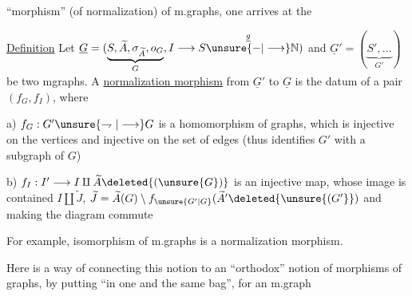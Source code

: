 ``morphism'' (of normalization) of m.graphs, one arrives at the

\uline{Definition} Let $\underline G=(\underbrace{S,\widetilde A,\sigma_{\widetilde A},o_G}_{G},I\longrightarrow S\overset{\underline g}{\unsure{-|\longrightarrow}}\mathbb N)$ and $\underline G'=(\underbrace{S',\ldots}_{G'})$ be two mgraphs. A \uline{normalization morphism} from $\underline G'$ to $\underline G$ is the datum of a pair  $(f_G,f_I)$, where

a) $f_G:G'\unsure{\rightharpoondown|\longrightarrow}G$ is a homomorphism of graphs, which is injective on the vertices and injective on the set of edges (thus identifies $G'$ with a subgraph of $G$)


b) $f_I:I'\longrightarrow I\amalg\widetilde A\deleted{(\unsure{G})}$ is an injective map, whose image is contained $I\amalg\widetilde J$,  $\widetilde J=\widetilde A(G)\setminus f_{\unsure{G'|G}}(\widetilde A'\deleted{\unsure{(G'}})$ and making the diagram commute

For example, isomorphism of m.graphs is a normalization morphism. 

Here is a way of connecting this notion to an ``orthodox'' notion of morphisms of graphs, by putting ``in one and the same bag'', for an m.graph
